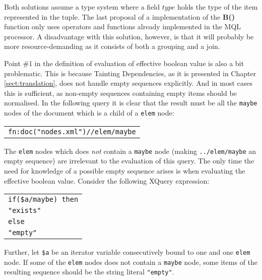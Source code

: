 Both solutions assume a type system where a field $type$ holds the type of the item represented in the tuple. The
last proposal of a implementation of the \textbf{B()} function only uses operators and functions already
implemented in the MQL processor. A disadvantage with this solution, however, is that it will probably be more
resource-demanding as it consists of both a grouping and a join.

Point \#1 in the definition of evaluation of effective boolean value is also a
bit problematic. This is because Tainting Dependencies, as it is presented in Chapter \ref{sect:translation},
does not handle empty sequences explicitly. And in most cases this is sufficient, as non-empty sequences containing
empty items should be normalised. In the following query it is clear that the result must be all the
\texttt{maybe} nodes of the document which is a child of a \texttt{elem} node:

\begin{center}
\begin{tabular}{l}
\texttt{fn:doc("nodes.xml")//elem/maybe}
\end{tabular}
\end{center}

The \texttt{elem} nodes which does \emph{not} contain a \texttt{maybe} node (making \texttt{../elem/maybe}
an empty sequence) are irrelevant to the evaluation of this query. The only time the need for knowledge of a
possible empty sequence arises is when evaluating the effective boolean value. Consider the following XQuery
expression:

\begin{center}
\begin{tabular}{l}
\texttt{if(\$a/maybe) then} \\ \quad
\texttt{"exists"} \\ 
\texttt{else} \\ \quad
\texttt{"empty"}
\end{tabular}
\end{center}

Further, let \texttt{\$a} be an iterator variable consecutively bound to one and one \texttt{elem} node. If
some of the \texttt{elem} nodes does not contain a \texttt{maybe} node, some items of the resulting sequence
should be the string literal \texttt{"empty"}.

